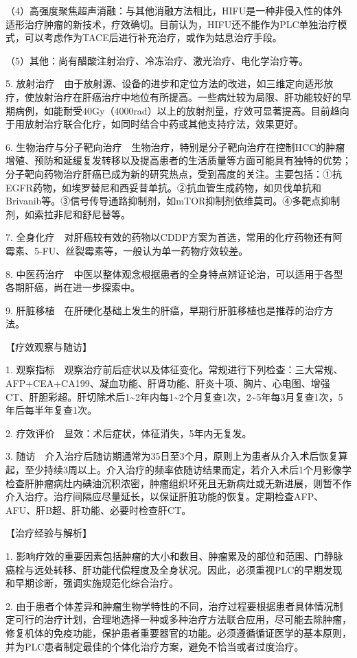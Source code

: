 （4）高强度聚焦超声消融：与其他消融方法相比，HIFU是一种非侵入性的体外适形治疗肿瘤的新技术，疗效确切。目前认为，HIFU还不能作为PLC单独治疗模式，可以考虑作为TACE后进行补充治疗，或作为姑息治疗手段。

（5）其他：尚有醋酸注射治疗、冷冻治疗、激光治疗、电化学治疗等。

5.
放射治疗　由于放射源、设备的进步和定位方法的改进，如三维定向适形放疗，使放射治疗在肝癌治疗中地位有所提高。一些病灶较为局限、肝功能较好的早期病例，如能耐受40Gy（4000rad）以上的放射剂量，疗效可显著提高。目前趋向于用放射治疗联合化疗，如同时结合中药或其他支持疗法，效果更好。

6.
生物治疗与分子靶向治疗　生物治疗，特别是分子靶向治疗在控制HCC的肿瘤增殖、预防和延缓复发转移以及提高患者的生活质量等方面可能具有独特的优势；分子靶向药物治疗肝癌已成为新的研究热点，受到高度的关注。主要包括：①抗EGFR药物，如埃罗替尼和西妥昔单抗。②抗血管生成药物，如贝伐单抗和Brivanib等。③信号传导通路抑制剂，如mTOR抑制剂依维莫司。④多靶点抑制剂，如索拉非尼和舒尼替等。

7.
全身化疗　对肝癌较有效的药物以CDDP方案为首选，常用的化疗药物还有阿霉素、5-FU、丝裂霉素等，一般认为单一药物疗效较差。

8.
中医药治疗　中医以整体观念根据患者的全身特点辨证论治，可以适用于各型各期肝癌，尚在进一步探索中。

9.
肝脏移植　在肝硬化基础上发生的肝癌，早期行肝脏移植也是推荐的治疗方法。

【疗效观察与随访】

1.
观察指标　观察治疗前后症状以及体征变化。常规进行下列检查：三大常规、AFP+CEA+CA199、凝血功能、肝肾功能、肝炎十项、胸片、心电图、增强CT、肝胆彩超。肝切除术后1\textasciitilde{}2年内每1\textasciitilde{}2个月复查1次，2\textasciitilde{}5年每3月复查1次，5年后每半年复查1次。

2. 疗效评价　显效：术后症状，体征消失，5年内无复发。

3.
随访　介入治疗后随访期通常为35日至3个月，原则上为患者从介入术后恢复算起，至少持续3周以上。介入治疗的频率依随访结果而定，若介入术后1个月影像学检查肝肿瘤病灶内碘油沉积浓密，肿瘤组织坏死且无新病灶或无新进展，则暂不作介入治疗。治疗间隔应尽量延长，以保证肝脏功能的恢复。定期检查AFP、AFU、肝B超、肝功能、必要时检查肝CT。

【治疗经验与解析】

1.
影响疗效的重要因素包括肿瘤的大小和数目、肿瘤累及的部位和范围、门静脉癌栓与远处转移、肝功能代偿程度及全身状况。因此，必须重视PLC的早期发现和早期诊断，强调实施规范化综合治疗。

2.
由于患者个体差异和肿瘤生物学特性的不同，治疗过程要根据患者具体情况制定可行的治疗计划，合理地选择一种或多种治疗方法联合应用，尽可能去除肿瘤，修复机体的免疫功能，保护患者重要器官的功能。必须遵循循证医学的基本原则，并为PLC患者制定最佳的个体化治疗方案，避免不恰当或者过度治疗。

